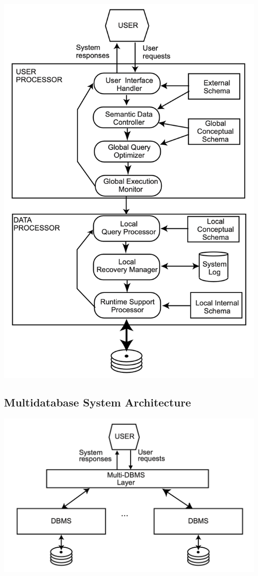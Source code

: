 \documentclass[12pt]{article}
\begin{document}
\includegraphics[scale=0.5, center]{assets/peer-to-peer-architecture.png}

\subsection{Multidatabase System Architecture}

\includegraphics[scale=0.5,center]{assets/components-of-a-mdbs.png}
\end{document}
